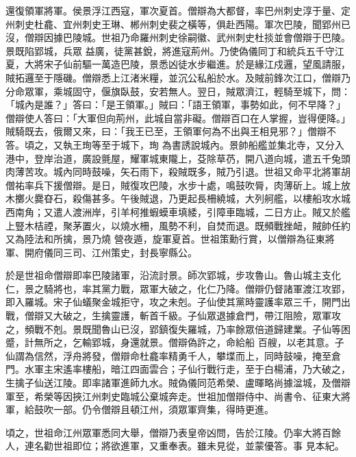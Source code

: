 \begin{pinyinscope}
 還復領軍將軍。侯景浮江西寇，軍次夏首。僧辯為大都督，率巴州刺史淳于量、定州刺史杜龕、宜州刺史王琳、郴州刺史裴之橫等，俱赴西陽。軍次巴陵，聞郢州已沒，僧辯因據巴陵城。世祖乃命羅州刺史徐嗣徽、武州刺史杜掞並會僧辯于巴陵。景既陷郢城，兵眾
 益廣，徒黨甚銳，將進寇荊州。乃使偽儀同丁和統兵五千守江夏，大將宋子仙前驅一萬造巴陵，景悉凶徒水步繼進。於是緣江戍邏，望風請服，賊拓邏至于隱磯。僧辯悉上江渚米糧，並沉公私船於水。及賊前鋒次江口，僧辯乃分命眾軍，乘城固守，偃旗臥鼓，安若無人。翌日，賊眾濟江，輕騎至城下，問：「城內是誰？」答曰：「是王領軍。」賊曰：「語王領軍，事勢如此，何不早降？」僧辯使人答曰：「大軍但向荊州，此城自當非礙。僧辯百口在人掌握，豈得便降。」賊騎既去，俄爾又來，曰：「我王已至，王領軍何為不出與王相見邪？」僧辯不答。頃之，又執王珣等至于城下，珣
 為書誘說城內。景帥船艦並集北寺，又分入港中，登岸治道，廣設氈屋，耀軍城東隴上，芟除草芿，開八道向城，遣五千兔頭肉薄苦攻。城內同時鼓噪，矢石雨下，殺賊既多，賊乃引退。世祖又命平北將軍胡僧祐率兵下援僧辯。是日，賊復攻巴陵，水步十處，鳴鼓吹脣，肉薄斫上。城上放木擲火爨昚石，殺傷甚多。午後賊退，乃更起長柵繞城，大列舸艦，以樓船攻水城西南角；又遣人渡洲岸，引羊柯推蝦蟆車填緌，引障車臨城，二日方止。賊又於艦上豎木桔禋，聚茅置火，以燒水柵，風勢不利，自焚而退。既頻戰挫衄，賊帥任約又為陸法和所擒，景乃燒
 營夜遁，旋軍夏首。世祖策勳行賞，以僧辯為征東將軍、開府儀同三司、江州策史，封長寧縣公。



 於是世祖命僧辯即率巴陵諸軍，沿流討景。師次郢城，步攻魯山。魯山城主支化仁，景之騎將也，率其黨力戰，眾軍大破之，化仁乃降。僧辯仍督諸軍渡江攻郢，即入羅城。宋子仙蟻聚金城拒守，攻之未剋。子仙使其黨時靈護率眾三千，開門出戰，僧辯又大破之，生擒靈護，斬首千級。子仙眾退據倉門，帶江阻險，眾軍攻之，頻戰不剋。景既聞魯山已沒，郢鎮復失羅城，乃率餘眾倍道歸建業。子仙等困蹙，計無所之，乞輸郢城，身還就景。僧辯偽許之，命給船
 百艘，以老其意。子仙謂為信然，浮舟將發，僧辯命杜龕率精勇千人，攀堞而上，同時鼓噪，掩至倉門。水軍主宋遙率樓船，暗江四面雲合；子仙行戰行走，至于白楊浦，乃大破之，生擒子仙送江陵。即率諸軍進師九水。賊偽儀同范希榮、盧暉略尚據湓城，及僧辯軍至，希榮等因挾江州刺史臨城公棄城奔走。世祖加僧辯侍中、尚書令、征東大將軍，給鼓吹一部。仍令僧辯且頓江州，須眾軍齊集，得時更進。



 頃之，世祖命江州眾軍悉同大舉，僧辯乃表皇帝凶問，告於江陵。仍率大將百餘人，連名勸世祖即位；將欲進軍，又重奉表。雖未見從，並蒙優答。事
 見本紀。




\end{pinyinscope}
